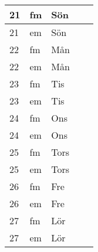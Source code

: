 \documentclass[a4paper]{article}
\begin{document}
\begin{table}[ht!]
\begin{tabular}{lllp{7cm}p{7cm}}
\multicolumn{1}{|l|}{21} & \multicolumn{1}{l|}{fm} & \multicolumn{1}{l|}{Sön} & \multicolumn{1}{l|}{} & \multicolumn{1}{l|}{} \\ \hline
\multicolumn{1}{|l|}{21} & \multicolumn{1}{l|}{em} & \multicolumn{1}{l|}{Sön} & \multicolumn{1}{l|}{} & \multicolumn{1}{l|}{} \\ \hline    

\multicolumn{1}{|l|}{22} & \multicolumn{1}{l|}{fm} & \multicolumn{1}{l|}{Mån} & \multicolumn{1}{l|}{} & \multicolumn{1}{l|}{} \\ \hline
\multicolumn{1}{|l|}{22} & \multicolumn{1}{l|}{em} & \multicolumn{1}{l|}{Mån} & \multicolumn{1}{l|}{} & \multicolumn{1}{l|}{} \\ \hline    

\multicolumn{1}{|l|}{23} & \multicolumn{1}{l|}{fm} & \multicolumn{1}{l|}{Tis} & \multicolumn{1}{l|}{} & \multicolumn{1}{l|}{} \\ \hline
\multicolumn{1}{|l|}{23} & \multicolumn{1}{l|}{em} & \multicolumn{1}{l|}{Tis} & \multicolumn{1}{l|}{} & \multicolumn{1}{l|}{} \\ \hline    

\multicolumn{1}{|l|}{24} & \multicolumn{1}{l|}{fm} & \multicolumn{1}{l|}{Ons} & \multicolumn{1}{l|}{} & \multicolumn{1}{l|}{} \\ \hline
\multicolumn{1}{|l|}{24} & \multicolumn{1}{l|}{em} & \multicolumn{1}{l|}{Ons} & \multicolumn{1}{l|}{} & \multicolumn{1}{l|}{} \\ \hline    

\multicolumn{1}{|l|}{25} & \multicolumn{1}{l|}{fm} & \multicolumn{1}{l|}{Tors} & \multicolumn{1}{l|}{} & \multicolumn{1}{l|}{} \\ \hline
\multicolumn{1}{|l|}{25} & \multicolumn{1}{l|}{em} & \multicolumn{1}{l|}{Tors} & \multicolumn{1}{l|}{} & \multicolumn{1}{l|}{} \\ \hline    

\multicolumn{1}{|l|}{26} & \multicolumn{1}{l|}{fm} & \multicolumn{1}{l|}{Fre} & \multicolumn{1}{l|}{} & \multicolumn{1}{l|}{} \\ \hline
\multicolumn{1}{|l|}{26} & \multicolumn{1}{l|}{em} & \multicolumn{1}{l|}{Fre} & \multicolumn{1}{l|}{} & \multicolumn{1}{l|}{} \\ \hline    

\multicolumn{1}{|l|}{27} & \multicolumn{1}{l|}{fm} & \multicolumn{1}{l|}{Lör} & \multicolumn{1}{l|}{} & \multicolumn{1}{l|}{} \\ \hline
\multicolumn{1}{|l|}{27} & \multicolumn{1}{l|}{em} & \multicolumn{1}{l|}{Lör} & \multicolumn{1}{l|}{} & \multicolumn{1}{l|}{} \\ \hline    


\end{tabular}
\end{table}
\end{document}
